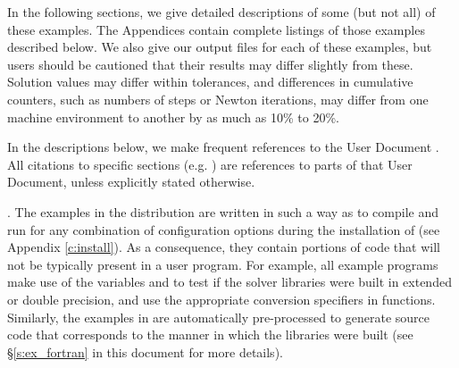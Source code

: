 \vspace{0.2in}\noindent 
In the following sections, we give detailed descriptions of some (but
not all) of these examples.  The Appendices contain complete listings
of those examples described below.  We also give our output files for
each of these examples, but users should be cautioned that their
results may differ slightly from these.  Solution
values may differ within tolerances, and differences in cumulative
counters, such as numbers of steps or Newton iterations, may differ
from one machine environment to another by as much as 10\% to 20\%.

In the descriptions below, we make frequent references to the {\ida}
User Document \cite{ida_ug}.  All citations to specific sections
(e.g. ) are references to parts of that User Document, unless
explicitly stated otherwise.

\vspace{0.2in}. 
The examples in the {\ida} distribution are written in such a way as
to compile and run for any combination of configuration options during the
installation of {\sundials} (see Appendix \ref{c:install}). As a consequence,
they contain portions of code that will not be typically present in a
user program. For example, all example programs make use of the
variables  and 
to test if the solver libraries were built in extended or double precision,
and use the appropriate conversion specifiers in  functions.
Similarly, the {\F} examples in {\fida} are automatically
pre-processed to generate source code that corresponds to the manner
in which the {\ida} libraries were built (see \S\ref{s:ex_fortran} in
this document for more details).
